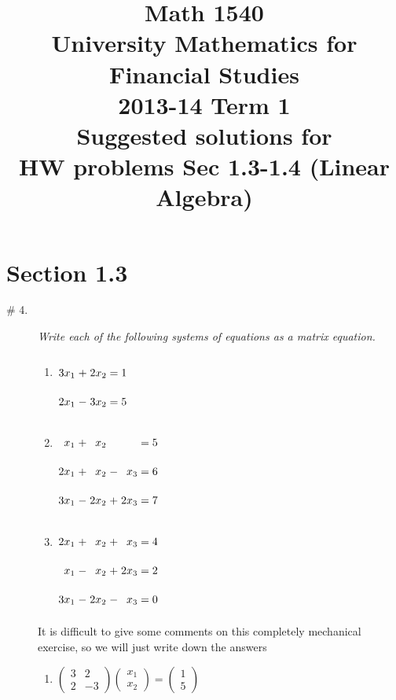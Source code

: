 \documentclass[8pt]{article} %
\title{Math 1540\\University Mathematics for Financial Studies\\2013-14 Term 1\\Suggested solutions for\\HW problems Sec 1.3-1.4 (Linear Algebra)}
\begin{document}
\maketitle
\section{Section 1.3}
\begin{description}
\item[\# 4.]{{\it Write each of the following systems of equations as a matrix equation.}
	\begin{multicols}{3}\begin{enumerate}[label=(\alph*)]
		\item $\arraycolsep=1.4pt\def\arraystretch{2.2}
			\begin{array}[t]{rrrrr}
				3x_1 & + {} & 2x_2 & = & 1\\
				2x_1 & - {} & 3x_2 & = & 5
			\end{array}$
		\item $\arraycolsep=1.4pt\def\arraystretch{2.2}
			\begin{array}[t]{rrrrrrr}
				x_1 & + {} & x_2 & & & = & 5\\
				2x_1 & + {} & x_2 & - {} & x_3 & = & 6\\
				3x_1 & - {} & 2x_2 & + {} & 2x_3 & = & 7
			\end{array}$
		\item $\arraycolsep=1.4pt\def\arraystretch{2.2}
			\begin{array}[t]{rrrrrrr}
				2x_1 & + {} & x_2 & + {} & x_3 & = & 4\\
				x_1 & - {} & x_2 & + {} & 2x_3 & = & 2\\
				3x_1 & - {} & 2x_2 & - {} & x_3 & = & 0
			\end{array}$
	\end{enumerate}\end{multicols}
	It is difficult to give some comments on this completely mechanical exercise, so we will just write down the answers
		\begin{enumerate}[label=(\alph*)]
		\item $\begin{pmatrix}3&2\\2&-3\end{pmatrix}\begin{pmatrix}x_1\\x_2\end{pmatrix}=\begin{pmatrix}1\\5\end{pmatrix}$

\end{enumerate}}
\end{description}
\end{document}
